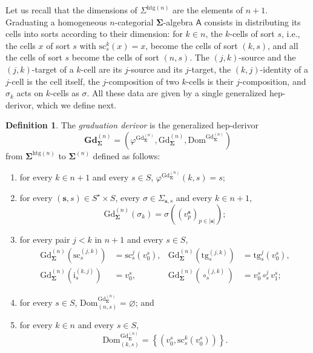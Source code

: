 \documentclass[a4paper, reqno]{amsbook}
\newcommand{\bb}[1]{\ensuremath{\lvert #1 \rvert}}
\newcommand{\sig}[1]{\mathbf{#1}}             %
\newcommand{\calg}[1]{\boldsymbol{\mathsf{#1}}} %
\newcommand{\Dom}{\mathrm{Dom}}
\newcommand{\htg}{\mathrm{htg}}                %
\newcommand{\src}{\mathrm{sc}}
\newcommand{\tgt}{\mathrm{tg}}
\newcommand{\Gd}{\mathrm{Gd}}
\newcommand{\bGd}{\mathbf{Gd}}
\theoremstyle{plain}
\theoremstyle{definition}
\newtheorem{definition}[theorem]{Definition}
\begin{document}
Let us recall that the dimensions of $\Sigma^{\htg(n)}$ are the elements of $n+1$.
Graduating a homogeneous $n$-categorial $\sig{\Sigma}$-algebra $\calg{A}$ consists in distributing its cells into sorts according to their dimension: for $k\in n$, the $k$-cells of sort $s$, i.e., the cells $x$ of sort $s$ with $\src^{k}_{s}(x)=x$, become the cells of sort $(k,s)$, and all the cells of sort $s$ become the cells of sort $(n,s)$.
The $(j,k)$-source and the $(j,k)$-target of a $k$-cell are its $j$-source and its $j$-target, the $(k,j)$-identity of a $j$-cell is the cell itself, the $j$-composition of two $k$-cells is their $j$-composition, and $\sigma_{k}$ acts on $k$-cells as $\sigma$.
All these data are given by a single generalized hep-derivor, which we define next.

\begin{definition}\label{DGdDerivor}
The \emph{graduation derivor} is the generalized hep-derivor
$$
\bGd^{(n)}_{\sig{\Sigma}}=\left(\varphi^{\Gd^{(n)}_{\sig{\Sigma}}},\Gd^{(n)}_{\sig{\Sigma}},\Dom^{\Gd^{(n)}_{\sig{\Sigma}}}\right)
$$
from $\sig{\Sigma}^{\htg(n)}$ to $\sig{\Sigma}^{(n)}$ defined as follows:
\begin{enumerate}
\item for every $k\in n+1$ and every $s\in S$, $\varphi^{\Gd^{(n)}_{\sig{\Sigma}}}(k,s)=s$;
\item for every $(\mathbf{s},s)\in S^{\star}\times S$, every $\sigma\in\Sigma_{\mathbf{s},s}$ and every $k\in n+1$,
$$
\Gd^{(n)}_{\sig{\Sigma}}(\sigma_{k})=\sigma((v^{\mathbf{s}}_{p})_{p\in\bb{\mathbf{s}}});
$$
\item for every pair $j<k$ in $n+1$ and every $s\in S$,
\begin{align*}
\Gd^{(n)}_{\sig{\Sigma}}(\src^{(j,k)}_{s})&=\src^{j}_{s}(v^{s}_{0}), &
\Gd^{(n)}_{\sig{\Sigma}}(\tgt^{(j,k)}_{s})&=\tgt^{j}_{s}(v^{s}_{0}),\\
\Gd^{(n)}_{\sig{\Sigma}}(\mathrm{i}^{(k,j)}_{s})&=v^{s}_{0}, &
\Gd^{(n)}_{\sig{\Sigma}}(\circ^{(j,k)}_{s})&=v^{s}_{0}\circ^{j}_{s}v^{s}_{1};
\end{align*}
\item for every $s\in S$, $\Dom^{\Gd^{(n)}_{\sig{\Sigma}}}_{(n,s)}=\varnothing$; and
\item for every $k\in n$ and every $s\in S$,
$$
\Dom^{\Gd^{(n)}_{\sig{\Sigma}}}_{(k,s)}=\left\lbrace\left(v^{s}_{0},\src^{k}_{s}(v^{s}_{0})\right)\right\rbrace.
$$
\end{enumerate}
\end{definition}
\end{document}
